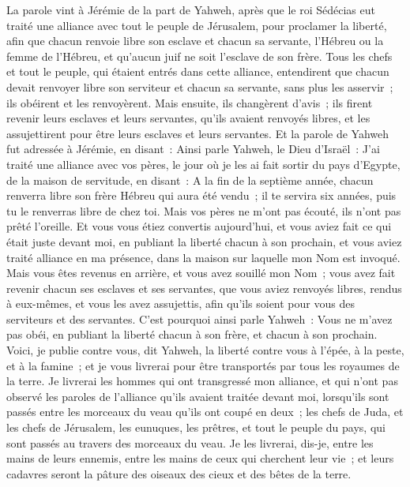 \begin{multicols}{2}
La parole vint à Jérémie de la part de Yahweh, après que le roi Sédécias eut traité une alliance avec tout le peuple de Jérusalem, pour proclamer la liberté,
afin que chacun renvoie libre son esclave et chacun sa servante, l'Hébreu ou la femme de l'Hébreu, et qu'aucun juif ne soit l'esclave de son frère.
Tous les chefs et tout le peuple, qui étaient entrés dans cette alliance, entendirent que chacun devait renvoyer libre son serviteur et chacun sa servante, sans plus les asservir~; ils obéirent et les renvoyèrent.
Mais ensuite, ils changèrent d'avis~; ils firent revenir leurs esclaves et leurs servantes, qu'ils avaient renvoyés libres, et les assujettirent pour être leurs esclaves et leurs servantes.
Et la parole de Yahweh fut adressée à Jérémie, en disant~:
Ainsi parle Yahweh, le Dieu d'Israël~: J'ai traité une alliance avec vos pères, le jour où je les ai fait sortir du pays d'Egypte, de la maison de servitude, en disant~:
A la fin de la septième année, chacun renverra libre son frère Hébreu qui aura été vendu~; il te servira six années, puis tu le renverras libre de chez toi. Mais vos pères ne m'ont pas écouté, ils n'ont pas prêté l'oreille.
Et vous vous étiez convertis aujourd'hui, et vous aviez fait ce qui était juste devant moi, en publiant la liberté chacun à son prochain, et vous aviez traité alliance en ma présence, dans la maison sur laquelle mon Nom est invoqué.
Mais vous êtes revenus en arrière, et vous avez souillé mon Nom~; vous avez fait revenir chacun ses esclaves et ses servantes, que vous aviez renvoyés libres, rendus à eux-mêmes, et vous les avez assujettis, afin qu'ils soient pour vous des serviteurs et des servantes.
C'est pourquoi ainsi parle Yahweh~: Vous ne m'avez pas obéi, en publiant la liberté chacun à son frère, et chacun à son prochain. Voici, je publie contre vous, dit Yahweh, la liberté contre vous à l'épée, à la peste, et à la famine~; et je vous livrerai pour être transportés par tous les royaumes de la terre.
Je livrerai les hommes qui ont transgressé mon alliance, et qui n'ont pas observé les paroles de l'alliance qu'ils avaient traitée devant moi, lorsqu'ils sont passés entre les morceaux du veau qu'ils ont coupé en deux~;
les chefs de Juda, et les chefs de Jérusalem, les eunuques, les prêtres, et tout le peuple du pays, qui sont passés au travers des morceaux du veau.
Je les livrerai, dis-je, entre les mains de leurs ennemis, entre les mains de ceux qui cherchent leur vie~; et leurs cadavres seront la pâture des oiseaux des cieux et des bêtes de la terre.

\end{multicols}
